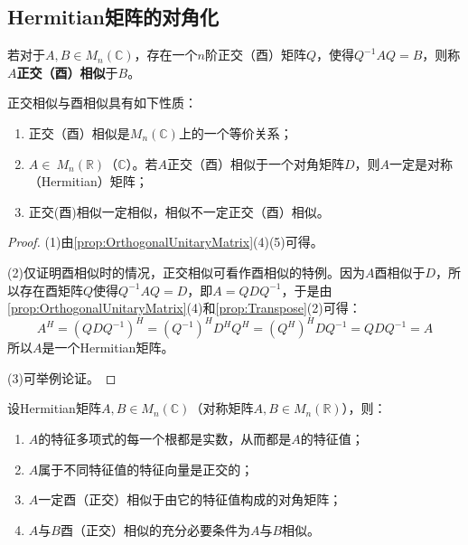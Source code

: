 \subsection{Hermitian矩阵的对角化}
\begin{definition}
	若对于$A,B\in M_{n}(\mathbb{C})$，存在一个$n$阶正交（酉）矩阵$Q$，使得$Q^{-1}AQ=B$，则称$A$\textbf{正交（酉）相似}于$B$。
\end{definition}
\begin{property}\label{prop:OrthogonalUnitarySimilarity}
	正交相似与酉相似具有如下性质：
	\begin{enumerate}
		\item 正交（酉）相似是$M_{n}(\mathbb{C})$上的一个等价关系；
		\item $A\in\ M_n(\mathbb{R})$（$\mathbb{C}$）。若$A$正交（酉）相似于一个对角矩阵$D$，则$A$一定是对称（Hermitian）矩阵；
		\item 正交(酉)相似一定相似，相似不一定正交（酉）相似。
	\end{enumerate}
\end{property}
\begin{proof}
	(1)由\cref{prop:OrthogonalUnitaryMatrix}(4)(5)可得。\par
	(2)仅证明酉相似时的情况，正交相似可看作酉相似的特例。因为$A$酉相似于$D$，所以存在酉矩阵$Q$使得$Q^{-1}AQ=D$，即$A=QDQ^{-1}$，于是由\cref{prop:OrthogonalUnitaryMatrix}(4)和\cref{prop:Transpose}(2)可得：
	\begin{equation*}
		A^H=(QDQ^{-1})^H=(Q^{-1})^HD^HQ^H=(Q^H)^HDQ^{-1}=QDQ^{-1}=A
	\end{equation*}
	所以$A$是一个Hermitian矩阵。\par
	(3)可举例论证。
\end{proof}
\begin{property}\label{prop:HermitianMatEigen}
	设Hermitian矩阵$A,B\in M_{n}(\mathbb{C})$（对称矩阵$A,B\in M_{n}(\mathbb{R})$），则：
	\begin{enumerate}
		\item $A$的特征多项式的每一个根都是实数，从而都是$A$的特征值；
		\item $A$属于不同特征值的特征向量是正交的；
		\item $A$一定酉（正交）相似于由它的特征值构成的对角矩阵；
		\item $A$与$B$酉（正交）相似的充分必要条件为$A$与$B$相似。
	\end{enumerate}
\end{property}
